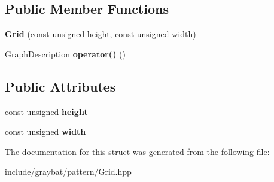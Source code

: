 \subsection*{Public Member Functions}
\begin{DoxyCompactItemize}
\item 
\hypertarget{structgraybat_1_1pattern_1_1Grid_afc52ac7cfc0b6f742dec72d2b6f0f509}{}{\bfseries Grid} (const unsigned height, const unsigned width)\label{structgraybat_1_1pattern_1_1Grid_afc52ac7cfc0b6f742dec72d2b6f0f509}

\item 
\hypertarget{structgraybat_1_1pattern_1_1Grid_a59206aa8d8597b462a51672bd143a446}{}Graph\+Description {\bfseries operator()} ()\label{structgraybat_1_1pattern_1_1Grid_a59206aa8d8597b462a51672bd143a446}

\end{DoxyCompactItemize}
\subsection*{Public Attributes}
\begin{DoxyCompactItemize}
\item 
\hypertarget{structgraybat_1_1pattern_1_1Grid_a8bd01cf7fce1097e0642256f6f91f638}{}const unsigned {\bfseries height}\label{structgraybat_1_1pattern_1_1Grid_a8bd01cf7fce1097e0642256f6f91f638}

\item 
\hypertarget{structgraybat_1_1pattern_1_1Grid_afafecacabb066eb00358d981208fba97}{}const unsigned {\bfseries width}\label{structgraybat_1_1pattern_1_1Grid_afafecacabb066eb00358d981208fba97}

\end{DoxyCompactItemize}


The documentation for this struct was generated from the following file\+:\begin{DoxyCompactItemize}
\item 
include/graybat/pattern/Grid.\+hpp\end{DoxyCompactItemize}
